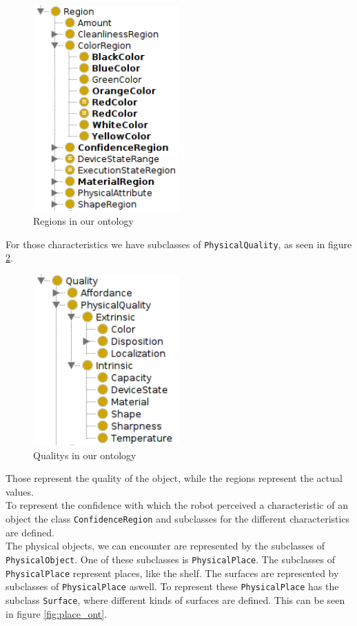 \documentclass[main.tex]{subfiles}
\begin{document}
\begin{figure}
\centering
\includegraphics[width=0.5\textwidth]{pictures/ontology/Ontologie_region.png}
\caption{Regions in our ontology}
\label{fig:region_ont}
\end{figure}

For those characteristics we have subclasses of \texttt{PhysicalQuality}, as seen in figure \ref{fig:quality_ont}.

\begin{figure}
\centering
\includegraphics[width=0.5\textwidth]{pictures/ontology/Ontologie_quality.png}
\caption{Qualitys in our ontology}
\label{fig:quality_ont}
\end{figure}

 Those represent the quality of the object, while the regions represent the actual values.\\
To represent the confidence with which the robot perceived a characteristic of an object the class \texttt{ConfidenceRegion} and subclasses for the different characteristics are defined.\\
The physical objects, we can encounter are represented by the subclasses of \texttt{PhysicalObject}.
One of these subclasses is \texttt{PhysicalPlace}. The subclasses of \texttt{PhysicalPlace} represent places, like the shelf. The surfaces are represented by subclasses of \texttt{PhysicalPlace} aswell. To represent these \texttt{PhysicalPlace} has the subclass \texttt{Surface}, where different kinds of surfaces are defined. This can be seen in figure \ref{fig:place_ont}.
\end{document}
